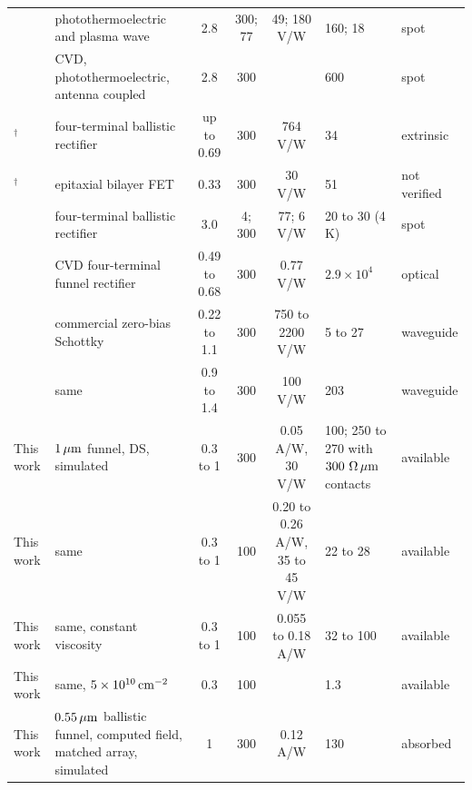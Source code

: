 \begin{table}
\begin{ruledtabular}
\begin{tabular}{lL{0.21\textwidth}cccL{0.14\textwidth}l}
\cite{viti2020hbn} & photothermoelectric and plasma wave & 2.8 & 300; 77 & 49; 180 V/W & 160; 18 & spot \\
\cite{asgari2021chip} & CVD, photothermoelectric, antenna coupled & 2.8 & 300 & & 600 & spot \\
\cite{auton2017terahertz}$^{\dagger}$ & four-terminal ballistic rectifier & up to 0.69 & 300 & 764 V/W & 34 & extrinsic \\
\cite{qin2017room}$^{\dagger}$ & epitaxial bilayer FET & 0.33 & 300 & 30 V/W & 51 & not verified \\
\cite{shi2026ballistic} & four-terminal ballistic rectifier & 3.0 & 4; 300 & 77; 6 V/W & 20 to 30 (4 K) & spot \\
\cite{hemmetter2026enhanced} & CVD four-terminal funnel rectifier & 0.49 to 0.68 & 300 & 0.77 V/W & $2.9\times10^{4}$ & optical \\
\cite{vdi2026detectors} & commercial zero-bias Schottky & 0.22 to 1.1 & 300 & 750 to 2200 V/W & 5 to 27 & waveguide \\
\cite{vdi2026detectors} & same & 0.9 to 1.4 & 300 & 100 V/W & 203 & waveguide \\
\hline
This work & $1\,\mu\mathrm{m}$ funnel, DS, simulated & 0.3 to 1 & 300 & 0.05 A/W, 30 V/W & 100; 250 to 270 with $300\ \Omega\,\mu\mathrm{m}$ contacts & available \\
This work & same & 0.3 to 1 & 100 & 0.20 to 0.26 A/W, 35 to 45 V/W & 22 to 28 & available \\
This work & same, constant viscosity & 0.3 to 1 & 100 & 0.055 to 0.18 A/W & 32 to 100 & available \\
This work & same, $5\times10^{10}\,\mathrm{cm^{-2}}$ & 0.3 & 100 & & 1.3 & available \\
This work & $0.55\,\mu\mathrm{m}$ ballistic funnel, computed field, matched array, simulated & 1 & 300 & 0.12 A/W & 130 & absorbed \\
\end{tabular}
\end{ruledtabular}
\end{table}

